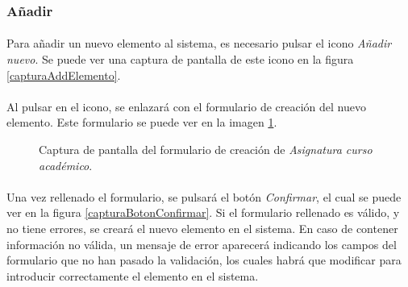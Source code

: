 \subsubsection{Añadir}

  \paragraph{}Para añadir un nuevo elemento al sistema, es necesario pulsar el
  icono \textit{Añadir nuevo}. Se puede ver una captura de pantalla de este
  icono en la figura \ref{capturaAddElemento}.

  \paragraph{}Al pulsar en el icono, se enlazará con el formulario de creación
  del nuevo elemento. Este formulario se puede ver en la imagen
  \ref{capturaAddMatricula}.

  \begin{figure}[!ht]
    \begin{center}
      \caption{Captura de pantalla del formulario de creación de \textit{Asignatura curso académico}.}
      \label{capturaAddMatricula}
    \end{center}
  \end{figure}

  \paragraph{}Una vez rellenado el formulario, se pulsará el botón
  \textit{Confirmar}, el cual se puede ver en la figura
  \ref{capturaBotonConfirmar}. Si el formulario rellenado es válido, y no tiene
  errores, se creará el nuevo elemento en el sistema. En caso de contener
  información no válida, un mensaje de error aparecerá indicando los campos
  del formulario que no han pasado la validación, los cuales habrá que modificar
  para introducir correctamente el elemento en el sistema.